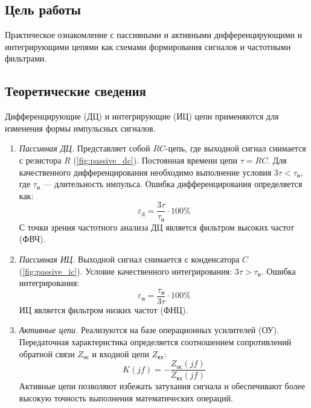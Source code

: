 \subsection*{Цель работы}
Практическое ознакомление с пассивными и активными дифференцирующими и интегрирующими цепями как схемами формирования сигналов и частотными фильтрами.

\subsection*{Теоретические сведения}

Дифференцирующие (ДЦ) и интегрирующие (ИЦ) цепи применяются для изменения формы импульсных сигналов. 

\begin{enumerate}
    \item \textit{Пассивная ДЦ.} Представляет собой $RC$-цепь, где выходной сигнал снимается с резистора $R$ (\cref{fig:passive_dc}). Постоянная времени цепи $\tau = RC$. Для качественного дифференцирования необходимо выполнение условия $3\tau < \tau_и$, где $\tau_и$ --- длительность импульса. Ошибка дифференцирования определяется как:
    \begin{equation*}
        \varepsilon_д = \frac{3\tau}{\tau_и} \cdot 100\%
    \end{equation*}
    С точки зрения частотного анализа ДЦ является фильтром высоких частот (ФВЧ).

    \item \textit{Пассивная ИЦ.} Выходной сигнал снимается с конденсатора $C$ (\cref{fig:passive_ic}). Условие качественного интегрирования: $3\tau > \tau_и$. Ошибка интегрирования:
    \begin{equation*}
        \varepsilon_и = \frac{\tau_и}{3\tau} \cdot 100\%
    \end{equation*}
    ИЦ является фильтром низких частот (ФНЦ).

    \item \textit{Активные цепи.} Реализуются на базе операционных усилителей (ОУ). Передаточная характеристика определяется соотношением сопротивлений обратной связи $Z_{ос}$ и входной цепи $Z_{вх}$:
    \begin{equation*}
        K(jf) = -\frac{Z_{ос}(jf)}{Z_{вх}(jf)}
    \end{equation*}
    Активные цепи позволяют избежать затухания сигнала и обеспечивают более высокую точность выполнения математических операций.
\end{enumerate}

